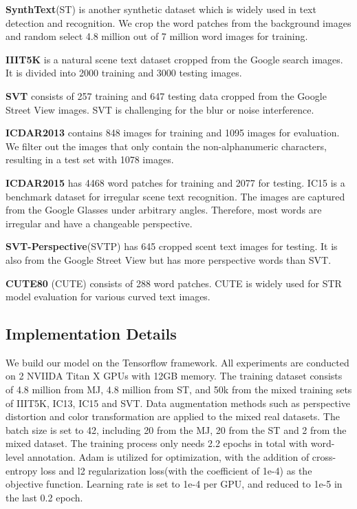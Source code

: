 \documentclass[runningheads]{llncs}
\begin{document}
\textbf{SynthText}(ST)\cite{gupta2016synthetic} is another synthetic dataset which is widely used in text detection and recognition. We crop the word patches from the background images and random select 4.8 million out of 7 million word images for training.

\textbf{IIIT5K}\cite{mishra2012scene} is a natural scene text dataset cropped from the Google search images. It is divided into 2000 training and 3000 testing images.

\textbf{SVT}\cite{wang2011end} consists of 257 training and 647 testing data cropped from the Google Street View images. SVT is challenging for the blur or noise interference.

\textbf{ICDAR2013}\cite{karatzas2013icdar} contains 848 images for training and 1095 images for evaluation. We filter out the images that only contain the non-alphanumeric characters, resulting in a test set with 1078 images. 

\textbf{ICDAR2015}\cite{karatzas2015icdar} has 4468 word patches for training and 2077 for testing. IC15 is a benchmark dataset for irregular scene text recognition. The images are captured from the Google Glasses under arbitrary angles. Therefore, most words are irregular and have a changeable perspective.

\textbf{SVT-Perspective}(SVTP)\cite{phan2013recognizing} has 645 cropped scent text images for testing. It is also from the Google Street View but has more perspective words than SVT.

\textbf{CUTE80} (CUTE)\cite{risnumawan2014robust} consists of 288 word patches. CUTE is widely used for STR model evaluation for various curved text images.


\subsection{Implementation Details}
We build our model on the Tensorflow framework. All experiments are conducted on 2 NVIIDA Titan X GPUs with 12GB memory. The training dataset consists of 4.8 million from MJ, 4.8 million from ST, and 50k from the mixed training sets of IIIT5K, IC13, IC15 and SVT. Data augmentation methods such as perspective distortion and color transformation are applied to the mixed real datasets. The batch size is set to 42, including 20 from the MJ, 20 from the ST and 2 from the mixed dataset. The training process only needs 2.2 epochs in total with word-level annotation. Adam is utilized for optimization, with the addition of cross-entropy loss and l2 regularization loss(with the coefficient of 1e-4) as the objective function. Learning rate is set to 1e-4 per GPU, and reduced to 1e-5 in the last 0.2 epoch.
\end{document}
